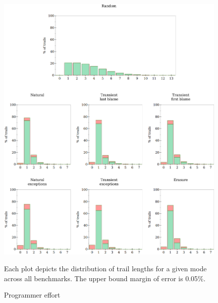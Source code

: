 \begin{figure} \footnotesize \centering
  \includegraphics[width=\textwidth]{./plots/bt-lengths-table}

  \vspace{1em}
  \begin{minipage}{0.95\textwidth}
    Each plot depicts the distribution of trail lengths for a given mode across all benchmarks.
    The upper bound margin of error is 0.05\%.
  \end{minipage}

  \caption{Programmer effort} \label{fig:effort-table}
\end{figure}

